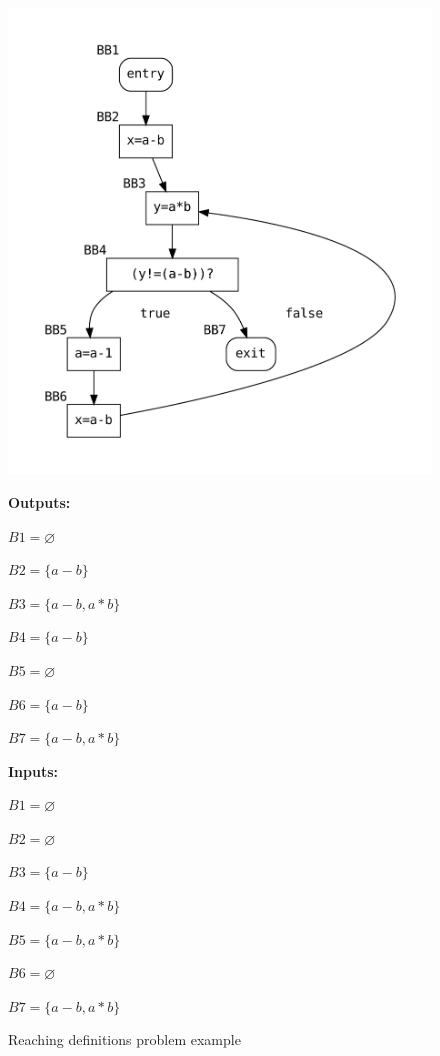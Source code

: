\documentclass{article}
\begin{document}
\begin{figure}[H]
    \centering
    \begin{minipage}{0.45\textwidth}
        \includegraphics[width=\linewidth]{graphs/available_expressions.pdf}
    \end{minipage}%
    \begin{minipage}{0.45\textwidth}
        \textbf{Outputs:}
        
        $B1 = \varnothing$
        
        $B2 = \{a-b\}$
        
        $B3 = \{a-b, a*b\}$
        
        $B4 = \{a-b\}$

        $B5 = \varnothing$
        
        $B6 = \{a-b\}$
        
        $B7 = \{a-b, a*b\}$

        \textbf{Inputs:}
        
        $B1 = \varnothing$
        
        $B2 = \varnothing$
        
        $B3 = \{a-b\}$
        
        $B4 = \{a-b, a*b\}$

        $B5 = \{a-b, a*b\}$
        
        $B6 = \varnothing$
        
        $B7 = \{a-b, a*b\}$
    \end{minipage}
    \caption{Reaching definitions problem example}
\end{figure}
\end{document}

